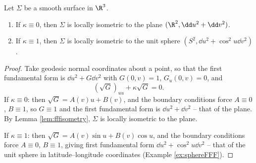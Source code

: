 \begin{proposition}
    Let $\Sigma$ be a smooth surface in $\R^3$.
    \begin{enumerate}[label=(\roman*)]
        \item If $\kappa \equiv 0$, then $\Sigma$ is locally isometric to the plane $(\R^2, \dd u^2 + \dd v^2)$.
        \item If $\kappa \equiv 1$, then $\Sigma$ is locally isometric to the unit sphere $(S^2, \dd u^2 + \cos^2 u \dd v^2)$.
    \end{enumerate}
\end{proposition}
\begin{proof}
    Take geodesic normal coordinates about a point, so that the first fundamental form is $\dd u^2 + G \dd v^2$ with $G(0, v) = 1$, $G_u(0, v) = 0$, and
    $$
    \left(\sqrt{G}\right)_{uu} + \kappa \sqrt{G} = 0.
    $$
    If $\kappa \equiv 0$: then $\sqrt{G} = A(v) u + B(v)$, and the boundary conditions force $A \equiv 0$, $B \equiv 1$, so $G \equiv 1$ and the first fundamental form is $\dd u^2 + \dd v^2$ -- that of the plane. By Lemma \ref{lem:fffisometry}, $\Sigma$ is locally isometric to the plane.

    If $\kappa \equiv 1$: then $\sqrt{G} = A(v)\sin u + B(v) \cos u$, and the boundary conditions force $A \equiv 0$, $B \equiv 1$, giving first fundamental form $\dd u^2 + \cos^2 u \dd v^2$ -- that of the unit sphere in latitude--longitude coordinates (Example \ref{ex:sphereFFF}).
\end{proof}

